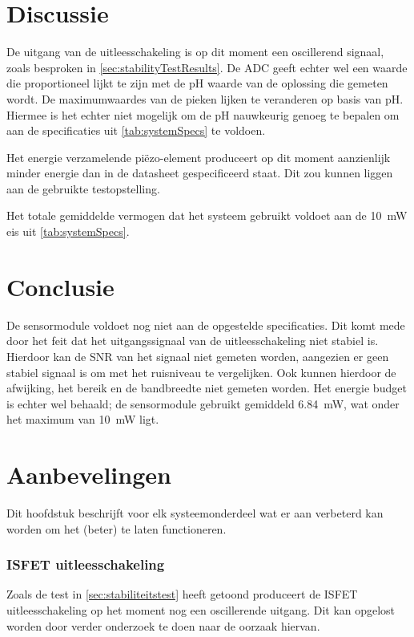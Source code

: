 \section{Discussie}


De uitgang van de uitleesschakeling is op dit moment een oscillerend signaal, zoals besproken in \cref{sec:stabilityTestResults}. De ADC geeft echter wel een waarde die proportioneel lijkt te zijn met de pH waarde van de oplossing die gemeten wordt.
De maximumwaardes van de pieken lijken te veranderen op basis van pH. Hiermee is het echter niet mogelijk om de pH nauwkeurig genoeg te bepalen om aan de specificaties uit \cref{tab:systemSpecs} te voldoen.

Het energie verzamelende piëzo-element produceert op dit moment aanzienlijk minder energie dan in de datasheet gespecificeerd staat. Dit zou kunnen liggen aan de gebruikte testopstelling.

Het totale gemiddelde vermogen dat het systeem gebruikt voldoet aan de \qty{10}{\milli\watt} eis uit \cref{tab:systemSpecs}.

\newpage
\section{Conclusie}
De sensormodule voldoet nog niet aan de opgestelde specificaties. Dit komt mede door het feit dat het uitgangssignaal van de uitleesschakeling niet stabiel is. Hierdoor kan de SNR van het signaal niet gemeten worden, aangezien er geen stabiel signaal is om met het ruisniveau te vergelijken. Ook kunnen hierdoor de afwijking, het bereik en de bandbreedte niet gemeten worden.
Het energie budget is echter wel behaald; de sensormodule gebruikt gemiddeld \qty{6.84}{\milli\watt}, wat onder het maximum van \qty{10}{\milli\watt} ligt.




\newpage
\section{Aanbevelingen}
Dit hoofdstuk beschrijft voor elk systeemonderdeel wat er aan verbeterd kan worden om het (beter) te laten functioneren.

\subsubsection*{ISFET uitleesschakeling}
Zoals de test in \cref{sec:stabiliteitstest} heeft getoond produceert de ISFET uitleesschakeling op het moment nog een oscillerende uitgang. Dit kan opgelost worden door verder onderzoek te doen naar de oorzaak hiervan.


